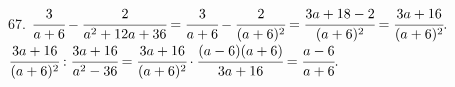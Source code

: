 67. $\cfrac{3}{a+6}-\cfrac{2}{a^2+12a+36}=\cfrac{3}{a+6}-\cfrac{2}{(a+6)^2}=\cfrac{3a+18-2}{(a+6)^2}=\cfrac{3a+16}{(a+6)^2}.$\\
$\cfrac{3a+16}{(a+6)^2}:\cfrac{3a+16}{a^2-36}=\cfrac{3a+16}{(a+6)^2}\cdot\cfrac{(a-6)(a+6)}{3a+16}=\cfrac{a-6}{a+6}.$\\
